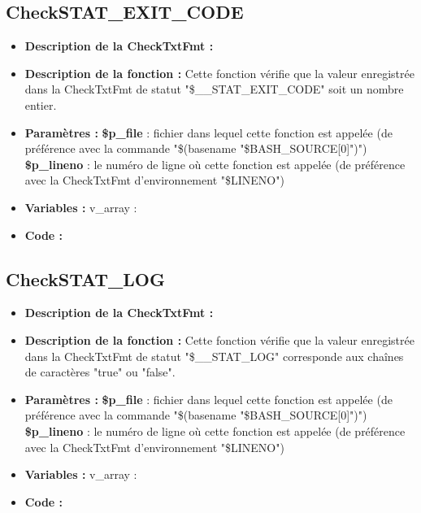 \documentclass[a4paper,10pt]{article}
\begin{document}
\subsection{CheckSTAT\_EXIT\_CODE}\color{white}
\begin{itemize}
    \item \textbf{Description de la CheckTxtFmt :}

    \item \textbf{Description de la fonction :} Cette fonction vérifie que la valeur enregistrée dans la CheckTxtFmt de statut "\$\_\_STAT\_EXIT\_CODE" soit un nombre entier.

    \item \textbf{Paramètres :}
        \color{orange}\textbf{\$p\_file}\color{white} : fichier dans lequel cette fonction est appelée (de préférence avec la commande "\$(\color{gray}basename \color{white}"\color{orange}\$BASH\_SOURCE[0]\color{white}")")
    \color{orange}\textbf{\$p\_lineno}\color{white} : le numéro de ligne où cette fonction est appelée (de préférence avec la CheckTxtFmt d'environnement "\color{orange}\$LINENO\color{white}")

    \item \textbf{Variables :} v\_array :

    \item \textbf{Code :}
\end{itemize}

\color{green}
\subsection{CheckSTAT\_LOG}\color{white}
\begin{itemize}
    \item \textbf{Description de la CheckTxtFmt :}

    \item \textbf{Description de la fonction :} Cette fonction vérifie que la valeur enregistrée dans la CheckTxtFmt de statut "\$\_\_STAT\_LOG" corresponde aux chaînes de caractères "true" ou "false".

    \item \textbf{Paramètres :}
        \color{orange}\textbf{\$p\_file}\color{white} : fichier dans lequel cette fonction est appelée (de préférence avec la commande "\$(\color{gray}basename \color{white}"\color{orange}\$BASH\_SOURCE[0]\color{white}")")
    \color{orange}\textbf{\$p\_lineno}\color{white} : le numéro de ligne où cette fonction est appelée (de préférence avec la CheckTxtFmt d'environnement "\color{orange}\$LINENO\color{white}")

    \item \textbf{Variables :} v\_array :

    \item \textbf{Code :}
\end{itemize}
\end{document}
